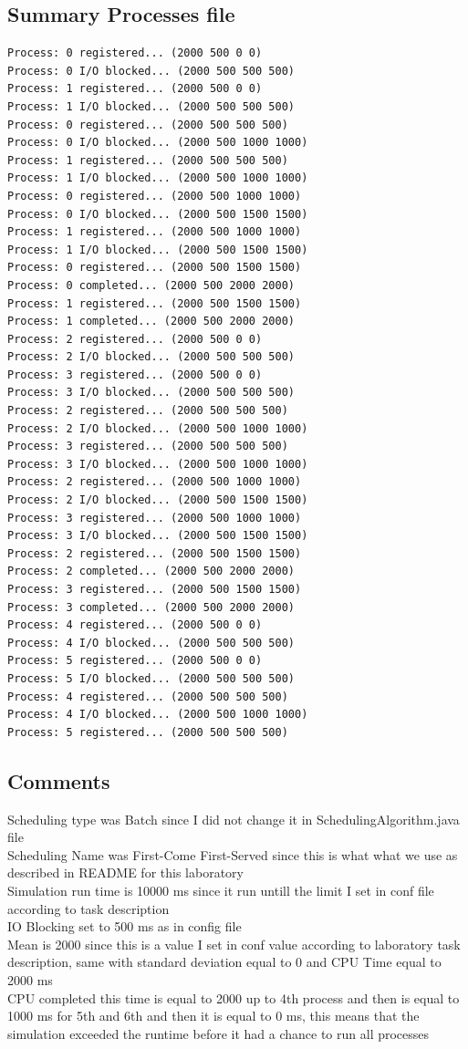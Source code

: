 \documentclass{article}
\begin{document}
\subsection{Summary Processes file}
\begin{lstlisting}         
Process: 0 registered... (2000 500 0 0)
Process: 0 I/O blocked... (2000 500 500 500)
Process: 1 registered... (2000 500 0 0)
Process: 1 I/O blocked... (2000 500 500 500)
Process: 0 registered... (2000 500 500 500)
Process: 0 I/O blocked... (2000 500 1000 1000)
Process: 1 registered... (2000 500 500 500)
Process: 1 I/O blocked... (2000 500 1000 1000)
Process: 0 registered... (2000 500 1000 1000)
Process: 0 I/O blocked... (2000 500 1500 1500)
Process: 1 registered... (2000 500 1000 1000)
Process: 1 I/O blocked... (2000 500 1500 1500)
Process: 0 registered... (2000 500 1500 1500)
Process: 0 completed... (2000 500 2000 2000)
Process: 1 registered... (2000 500 1500 1500)
Process: 1 completed... (2000 500 2000 2000)
Process: 2 registered... (2000 500 0 0)
Process: 2 I/O blocked... (2000 500 500 500)
Process: 3 registered... (2000 500 0 0)
Process: 3 I/O blocked... (2000 500 500 500)
Process: 2 registered... (2000 500 500 500)
Process: 2 I/O blocked... (2000 500 1000 1000)
Process: 3 registered... (2000 500 500 500)
Process: 3 I/O blocked... (2000 500 1000 1000)
Process: 2 registered... (2000 500 1000 1000)
Process: 2 I/O blocked... (2000 500 1500 1500)
Process: 3 registered... (2000 500 1000 1000)
Process: 3 I/O blocked... (2000 500 1500 1500)
Process: 2 registered... (2000 500 1500 1500)
Process: 2 completed... (2000 500 2000 2000)
Process: 3 registered... (2000 500 1500 1500)
Process: 3 completed... (2000 500 2000 2000)
Process: 4 registered... (2000 500 0 0)
Process: 4 I/O blocked... (2000 500 500 500)
Process: 5 registered... (2000 500 0 0)
Process: 5 I/O blocked... (2000 500 500 500)
Process: 4 registered... (2000 500 500 500)
Process: 4 I/O blocked... (2000 500 1000 1000)
Process: 5 registered... (2000 500 500 500)
\end{lstlisting}     
\subsection{Comments}
Scheduling type was Batch since I did not change it in SchedulingAlgorithm.java
file \\
Scheduling Name was First-Come First-Served since this is what what we use as
described in README for this laboratory \\
Simulation run time is 10000 ms since it run untill the limit I set in conf file
according to task description \\
IO Blocking set to 500 ms as in config file \\
Mean is 2000 since this is a value I set in conf value according to laboratory
task description, same with standard deviation equal to 0 and CPU Time equal to
2000 ms \\
CPU completed this time is equal to 2000 up to 4th process and then is equal to
1000 ms for 5th and 6th and then it is equal to 0 ms, this means that the
simulation exceeded the runtime before it had a chance to run all processes
\end{document}
